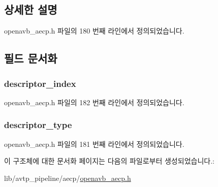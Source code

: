 \subsection{상세한 설명}


openavb\+\_\+aecp.\+h 파일의 180 번째 라인에서 정의되었습니다.



\subsection{필드 문서화}
\subsubsection[{\texorpdfstring{descriptor\+\_\+index}{descriptor_index}}]{ descriptor\+\_\+index}\hypertarget{structopenavb__aecp__command__data__get__sampling__rate__t_ab26fb363c24b9a2a4391f9171c981b08}{}\label{structopenavb__aecp__command__data__get__sampling__rate__t_ab26fb363c24b9a2a4391f9171c981b08}


openavb\+\_\+aecp.\+h 파일의 182 번째 라인에서 정의되었습니다.

\subsubsection[{\texorpdfstring{descriptor\+\_\+type}{descriptor_type}}]{ descriptor\+\_\+type}\hypertarget{structopenavb__aecp__command__data__get__sampling__rate__t_a1e231d7874aada5925b29affc76782cc}{}\label{structopenavb__aecp__command__data__get__sampling__rate__t_a1e231d7874aada5925b29affc76782cc}


openavb\+\_\+aecp.\+h 파일의 181 번째 라인에서 정의되었습니다.



이 구조체에 대한 문서화 페이지는 다음의 파일로부터 생성되었습니다.\+:\begin{DoxyCompactItemize}
\item 
lib/avtp\+\_\+pipeline/aecp/\hyperlink{openavb__aecp_8h}{openavb\+\_\+aecp.\+h}\end{DoxyCompactItemize}
